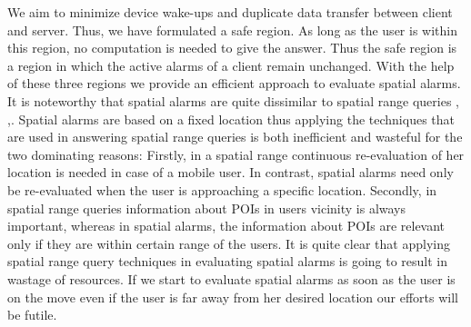 We aim to minimize device wake-ups and duplicate data transfer between client and server. Thus, we have formulated a safe region. As long as the user is within this region, no computation is needed to give the answer. Thus the safe region is a region in which the active alarms of a client remain unchanged. With the help of these three regions we provide an efficient approach to evaluate spatial alarms. It is noteworthy that spatial alarms are quite dissimilar to spatial range queries \cite{Tanzima:Ali}, \cite{mknn},\cite{NN1}. Spatial alarms are based on a fixed location thus applying the techniques that are used in answering spatial range queries is both inefficient and wasteful for the two dominating reasons: Firstly, in a spatial range continuous re-evaluation of her location is needed in case of a mobile user. In contrast, spatial alarms need only be re-evaluated when the user is approaching a specific location. Secondly, in spatial range queries information about POIs in users vicinity is always important, whereas in spatial alarms, the information about POIs are relevant only if they are within certain range of the users. It is quite clear that applying spatial range query techniques in evaluating spatial alarms is going to result in wastage of resources. If we start to evaluate spatial alarms as soon as the user is on the move even if the user is far away from her desired location our efforts will be futile. 
\vspace*{10pt}



